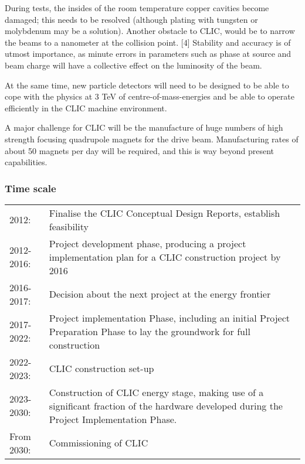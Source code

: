 During tests, the insides of the room temperature copper cavities become damaged; this needs to be resolved (although plating with tungsten or molybdenum may be a solution). Another obstacle to CLIC, would be to narrow the beams to a nanometer at the collision point. [4] Stability and accuracy is of utmost importance, as minute errors in parameters such as phase at source and beam charge will have a collective effect on the luminosity of the beam. \cite{CLIC:DriveBeam}

At the same time, new particle detectors will need to be designed to be able to cope with the physics at 3 TeV of centre-of-mass-energies and be able to operate efficiently in the CLIC machine environment. \cite{CLIC:Concept}

A major challenge for CLIC will be the manufacture of huge numbers of high strength focusing quadrupole magnets for the drive beam. Manufacturing rates of about 50 magnets per day will be required, and this is way beyond present capabilities. \cite{CLIC:STFC}
 
\subsubsection{Time scale}

\begin{tabular}{p{2cm} p{12cm}}

2012: & Finalise the CLIC Conceptual Design Reports, establish feasibility \\
2012-2016: & Project development phase, producing a project implementation plan for a CLIC construction project by 2016 \\
2016-2017: & Decision about the next project at the energy frontier \\
2017-2022: & Project implementation Phase, including an initial Project Preparation Phase to lay the groundwork for full construction \\
2022-2023: & CLIC construction set-up \\
2023-2030: & Construction of CLIC energy stage, making use of a significant fraction of the hardware developed during the Project Implementation Phase. \\
From 2030: & Commissioning of CLIC \\

\end{tabular}


